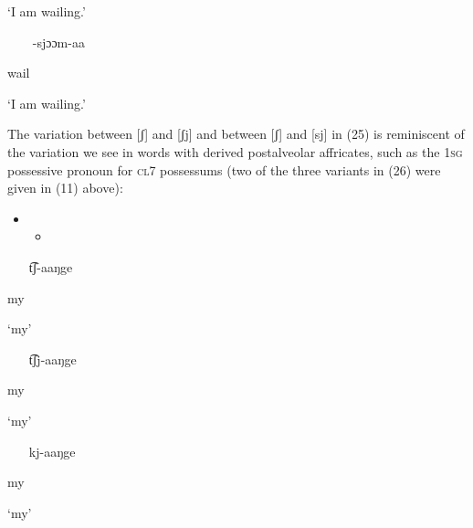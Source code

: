 \textsc{‘I }am wailing.’

\begin{itemize}
\item [-sjɔɔm-aa]

\end{itemize}

wail

\textsc{‘I }am wailing.’

The variation between [ʃ] and [ʃj] and between [ʃ] and [sj] in (25) is reminiscent of the variation we see in words with derived postalveolar affricates, such as the 1\textsc{sg} possessive pronoun for \textsc{cl}7 possessums (two of the three variants in (26) were given in (11) above):

\setcounter{itemize}{0}
\begin{itemize}
\item \setcounter{itemize}{0}
\begin{itemize}
\item \end{itemize}
\end{itemize}
\setcounter{itemize}{0}
\begin{itemize}
\item [t͡ʃ-aaŋge]

\end{itemize}

my

‘my’

\begin{itemize}
\item [t͡ʃj-aaŋge]

\end{itemize}

my

‘my’

\begin{itemize}
\item [kj-aaŋge]

\end{itemize}

my

‘my’

